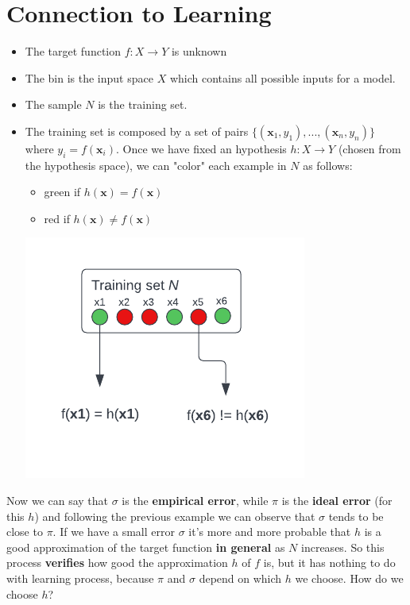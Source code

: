 \section{Connection to Learning}
\begin{itemize}
    \item The target function $f: X \rightarrow Y$ is unknown
    \item The bin is the input space $X$ which contains all possible inputs for a model.
    \item The sample $N$ is the training set.
    
    \item The training set is composed by a set of pairs $\{(\textbf{x}_{1},y_{1}),...,(\textbf{x}_{n},y_{n})\}$ where $y_{i} = f(\textbf{x}_{i})$. Once we have fixed an hypothesis $h: X \rightarrow Y$ (chosen from the hypothesis space), we can "color" each example in $N$ as follows:
    \begin{itemize}
        \item green if $h(\textbf{x}) = f(\textbf{x})$
        \item red if $h(\textbf{x}) \neq f(\textbf{x})$
    \end{itemize}
    \begin{center}
        \includegraphics{images/Training set.png}
    \end{center}
\end{itemize}
Now we can say that $\sigma$ is the \textbf{empirical error}, while $\pi$ is the \textbf{ideal error} (for this $h$) and following the previous example we can observe that $\sigma$ tends to be close to $\pi$. If we have a small error $\sigma$ it's more and more probable that $h$ is a good approximation of the target function \textbf{in general} as $N$ increases. So this process \textbf{verifies} how good the approximation $h$ of $f$ is, but it has nothing to do with learning process, because $\pi$ and $\sigma$ depend on which $h$ we choose. How do we choose $h$?
